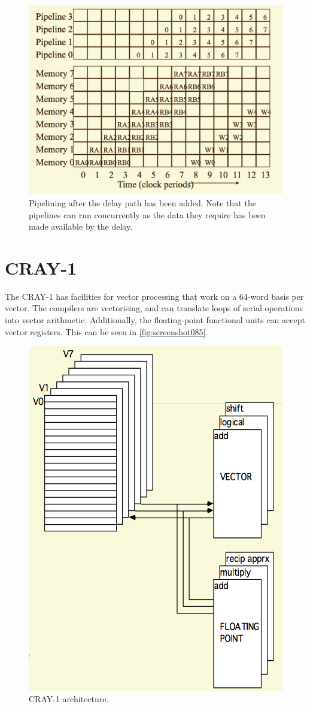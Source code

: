 \begin{figure}
\centering
\includegraphics[width=0.7\linewidth]{screenshot084}
\caption[Delay path pipelining.]{Pipelining after the delay path has been added. Note that the pipelines can run concurrently as the data they require has been made available by the delay.}
\label{fig:screenshot084}
\end{figure}

\section{CRAY-1}
The CRAY-1 has facilities for vector processing that work on a 64-word basis per vector. The compilers are vectorising, and can translate loops of serial operations into vector arithmetic. Additionally, the floating-point functional units can accept vector registers. This can be seen in \autoref{fig:screenshot085}.

\begin{figure}
\centering
\includegraphics[width=0.7\linewidth]{screenshot085}
\caption{CRAY-1 architecture.}
\label{fig:screenshot085}
\end{figure}

